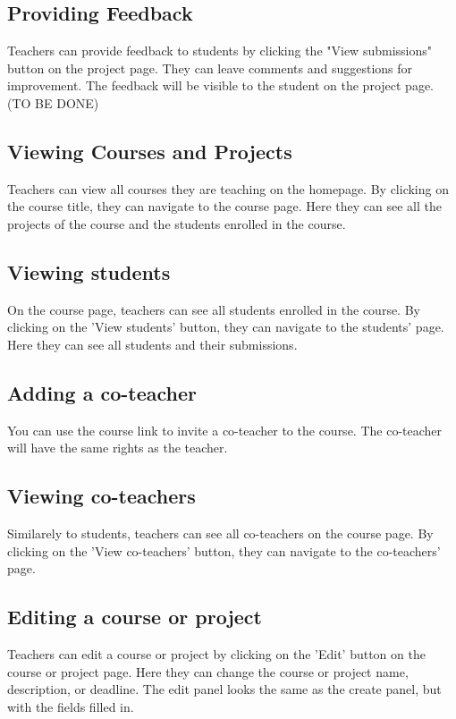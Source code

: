 \documentclass{article}
\begin{document}
\subsection{Providing Feedback}
Teachers can provide feedback to students by clicking the "View submissions" button on the project page. They can leave comments and suggestions for improvement. The feedback will be visible to the student on the project page. (TO BE DONE)

\subsection{Viewing Courses and Projects}
Teachers can view all courses they are teaching on the homepage. By clicking on the course title, they can navigate to the course page. Here they can see all the projects of the course and the students enrolled in the course.

\subsection{Viewing students}
On the course page, teachers can see all students enrolled in the course. By clicking on the 'View students' button, they can navigate to the students' page. Here they can see all students and their submissions.

\subsection{Adding a co-teacher}
You can use the course link to invite a co-teacher to the course. The co-teacher will have the same rights as the teacher.

\subsection{Viewing co-teachers}
Similarely to students, teachers can see all co-teachers on the course page. By clicking on the 'View co-teachers' button, they can navigate to the co-teachers' page.

\subsection{Editing a course or project}
Teachers can edit a course or project by clicking on the 'Edit' button on the course or project page. Here they can change the course or project name, description, or deadline. The edit panel looks the same as the create panel, but with the fields filled in.
\end{document}
